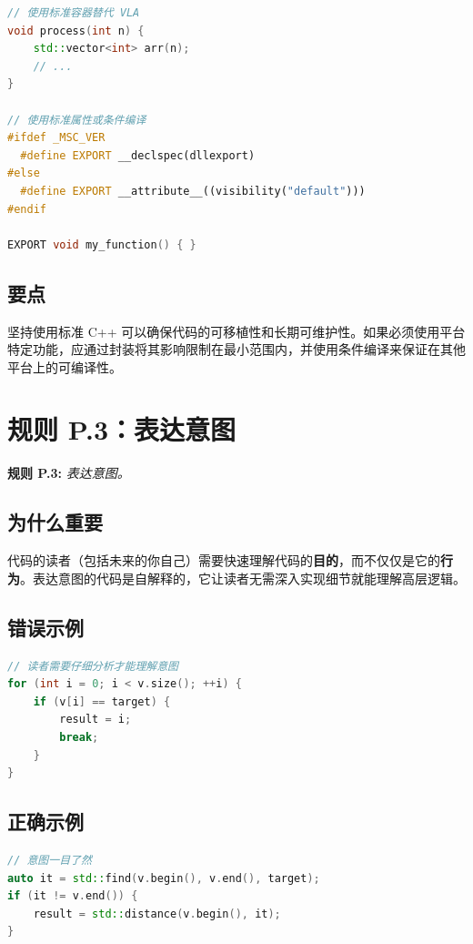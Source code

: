 \begin{lstlisting}[language=C++]
// 使用标准容器替代 VLA
void process(int n) {
    std::vector<int> arr(n);
    // ...
}

// 使用标准属性或条件编译
#ifdef _MSC_VER
  #define EXPORT __declspec(dllexport)
#else
  #define EXPORT __attribute__((visibility("default")))
#endif

EXPORT void my_function() { }
\end{lstlisting}

\subsection{要点}
坚持使用标准 C++ 可以确保代码的可移植性和长期可维护性。如果必须使用平台特定功能，应通过封装将其影响限制在最小范围内，并使用条件编译来保证在其他平台上的可编译性。

\section{规则 P.3：表达意图}

\textbf{规则 P.3:} \textit{表达意图。}

\subsection{为什么重要}

代码的读者（包括未来的你自己）需要快速理解代码的\textbf{目的}，而不仅仅是它的\textbf{行为}。表达意图的代码是自解释的，它让读者无需深入实现细节就能理解高层逻辑。

\subsection{错误示例}

\begin{lstlisting}[language=C++]
// 读者需要仔细分析才能理解意图
for (int i = 0; i < v.size(); ++i) {
    if (v[i] == target) {
        result = i;
        break;
    }
}
\end{lstlisting}

\subsection{正确示例}

\begin{lstlisting}[language=C++]
// 意图一目了然
auto it = std::find(v.begin(), v.end(), target);
if (it != v.end()) {
    result = std::distance(v.begin(), it);
}
\end{lstlisting}

